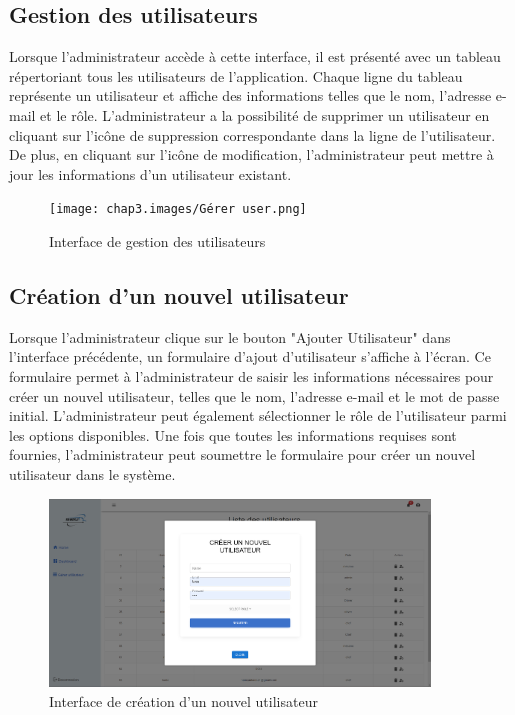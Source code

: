 \newpage
\subsection{Gestion des utilisateurs}
Lorsque l'administrateur accède à cette interface, il est présenté avec un tableau répertoriant tous les utilisateurs de l'application. Chaque ligne du tableau représente un utilisateur et affiche des informations telles que le nom, l'adresse e-mail et le rôle. L'administrateur a la possibilité de supprimer un utilisateur en cliquant sur l'icône de suppression correspondante dans la ligne de l'utilisateur. De plus, en cliquant sur l'icône de modification, l'administrateur peut mettre à jour les informations d'un utilisateur existant.

\begin{figure}[ht!]
  \centering
  \texttt{[image: chap3.images/Gérer user.png]}
  \caption{Interface de gestion des utilisateurs}

\end{figure}

\newpage
\subsection{Création d'un nouvel utilisateur}
Lorsque l'administrateur clique sur le bouton "Ajouter Utilisateur" dans l'interface précédente, un formulaire d'ajout d'utilisateur s'affiche à l'écran. Ce formulaire permet à l'administrateur de saisir les informations nécessaires pour créer un nouvel utilisateur, telles que le nom, l'adresse e-mail et le mot de passe initial. L'administrateur peut également sélectionner le rôle de l'utilisateur parmi les options disponibles. Une fois que toutes les informations requises sont fournies, l'administrateur peut soumettre le formulaire pour créer un nouvel utilisateur dans le système.\\

\begin{figure}[ht!]
  \centering
  \includegraphics[width=0.9\textwidth]{chap3.images/creer user.png}
  \caption{Interface de création d'un nouvel utilisateur}

\end{figure}


